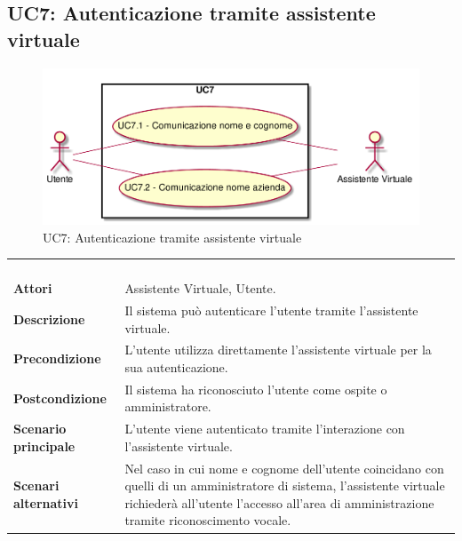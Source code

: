 \subsection{UC7: Autenticazione tramite assistente virtuale}
\label{UC7}
\begin{figure}[h]
\centering
\includegraphics[width=\textwidth,height=\textheight,keepaspectratio]{images/UseCaseUC7.png}
\caption{UC7: Autenticazione tramite assistente virtuale}
\end{figure}
\begin{longtable}{l|p{10cm}}
\rowcolor[gray]{0.8} \multicolumn{2}{c}{} \\
\rowcolor[gray]{0.8} \multicolumn{2}{c}{\textbf{UC7 - Autenticazione tramite assistente virtuale}} \\
\rowcolor[gray]{0.8} \multicolumn{2}{c}{} \\
\hline
&\\
\textbf{Attori} & Assistente Virtuale, Utente.\\[7pt]
\textbf{Descrizione} & Il sistema può autenticare l'utente tramite l'assistente virtuale.\\[7pt]
\textbf{Precondizione} & L'utente utilizza direttamente l'assistente virtuale per la sua autenticazione.\\[7pt]
\textbf{Postcondizione} & Il sistema ha riconosciuto l'utente come ospite o amministratore.\\[7pt]
\textbf{Scenario principale} &L'utente viene autenticato tramite l'interazione con l'assistente virtuale.\\[7pt]
\textbf{Scenari alternativi} & Nel caso in cui nome e cognome dell'utente coincidano con quelli di un amministratore di sistema, l'assistente virtuale
richiederà all'utente l'accesso all'area di amministrazione tramite riconoscimento vocale.\\[7pt]\hline
\end{longtable}

